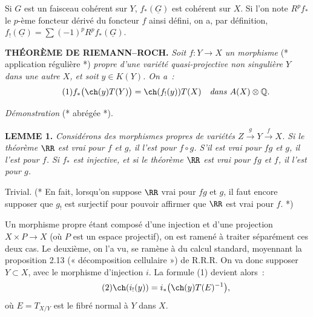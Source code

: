 Si \(G\) est un
faisceau cohérent sur \(Y\), \(f_*(\underline G)\) est cohérent sur \(X\). Si l'on note \(R^pf_*\) le \(p\)-ème foncteur dérivé du foncteur \(f\) ainsi défini, on a, par définition, \(f_!(\underline G)=\sum(-1)^p R^pf_*(\underline G)\).\quad*

\textbf{THÉORÈME DE RIEMANN--ROCH.} \emph{Soit \(f:Y\longrightarrow X\) un morphisme} (* application régulière *) \emph{propre d'une variété quasi-projective non singulière \(Y\) dans une autre \(X\), et soit \(y\in K(Y)\). On a~:}
\begin{equation}\tag{1}
  f_*\bigl(\ch(y)T(Y)\bigr)=\ch(f_!(y))T(X)
  \quad\text{\emph{dans} } A(X)\otimes\mathbb Q.
\end{equation}

\emph{Démonstration} (* abrégée *).

\textbf{LEMME 1.} \emph{Considérons des morphismes propres de variétés \(Z\xrightarrow{g}Y\xrightarrow{f}X\). Si le théorème \(\RR\) est vrai pour \(f\) et \(g\), il l'est pour \(f\circ g\). S'il est vrai pour \(fg\) et \(g\), il l'est pour \(f\). Si \(f_*\) est injective, et si le théorème \(\RR\) est vrai pour \(fg\) et \(f\), il l'est pour \(g\).}

Trivial. (* En fait, lorsqu'on suppose \(\RR\) vrai pour \(fg\) et \(g\), il faut encore supposer que \(g_!\) est surjectif pour pouvoir affirmer que \(\RR\) est vrai pour \(f\). *)

Un morphisme propre étant composé d'une injection et d'une projection \(X\times P\longrightarrow X\) (où \(P\) est un espace projectif), on est ramené à traiter séparément ces deux cas. Le deuxième, on l'a vu, se ramène à du calcul standard, moyennant la proposition 2.13 (« décomposition cellulaire ») de R.R.R. On va donc supposer \(Y\subset X\), avec le morphisme d'injection \(i\). La formule (1) devient alors~:
\begin{equation}\tag{2}
  \ch(i_!(y))=i_*\bigl(\ch(y)T(E)^{-1}\bigr),
\end{equation}
où \(E=T_{X/Y}\) est le fibré normal à \(Y\) dans \(X\).

